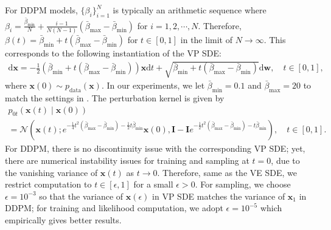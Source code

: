 \documentclass{article} %
\newcommand{\ud}{\mathrm{d}}
\newcommand{\mcal}{\mathcal}
\newcommand{\bfx}{\mathbf{x}}
\newcommand{\bfw}{\mathbf{w}}
\newcommand{\bfI}{\mathbf{I}}
\newcommand{\bbeta}{\bar{\beta}}
\newcommand{\bbetam}{\bbeta_{\text{min}}}
\newcommand{\bbetaM}{\bbeta_{\text{max}}}
\begin{document}
For DDPM models, $\{\beta_i\}_{i=1}^N$ is typically an arithmetic sequence where $\beta_i = \frac{\bbetam}{N} + \frac{i-1}{N(N-1)}(\bbetaM -\bbetam)$ for $i=1,2,\cdots, N$. Therefore, $\beta(t) = \bbetam + t(\bbetaM - \bbetam)$ for $t\in[0,1]$ in the limit of $N \to \infty$. This corresponds to the following instantiation of the VP SDE:
\begin{gather}
\ud \bfx = -\frac{1}{2}(\bbetam + t(\bbetaM - \bbetam)) \bfx \ud t + \sqrt{\bbetam + t(\bbetaM - \bbetam)} \ud \bfw, \quad t\in[0,1],
\end{gather}
where $\bfx(0) \sim p_\text{data}(\bfx)$. In our experiments, we let $\bbetam = 0.1$ and $\bbetaM = 20$ to match the settings in \citet{ho2020denoising}. The perturbation kernel is given by
\begin{multline}
    p_{0t}(\bfx(t) \mid \bfx(0)) \\
    = \mcal{N}\left(\bfx(t) ; e^{-\frac{1}{4}t^2(\bbetaM-\bbetam) - \frac{1}{2}t\bbetam}\bfx(0), \bfI - \bfI e^{-\frac{1}{2}t^2(\bbetaM -\bbetam) - t\bbetam} \right), \quad t\in[0,1].
\end{multline}
For DDPM, there is no discontinuity issue with the corresponding VP SDE; yet, there are numerical instability issues for training and sampling at $t=0$, due to the vanishing variance of $\bfx(t)$ as $t \to 0$. Therefore, same as the VE SDE, we restrict computation to $t\in[\epsilon, 1]$ for a small $\epsilon > 0$. For sampling, we choose $\epsilon=10^{-3}$ so that the variance of $\bfx(\epsilon)$ in VP SDE matches the variance of $\bfx_1$ in DDPM; for training and likelihood computation, we adopt $\epsilon=10^{-5}$ which empirically gives better results.
\end{document}
